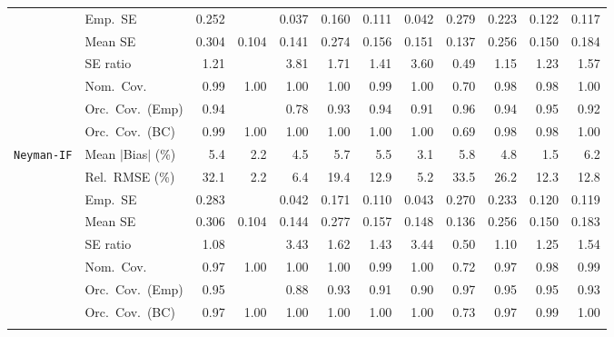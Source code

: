 \begin{landscape}
\begin{longtable}{llrrrrrrrrrr}
 & Emp.\ SE & 0.252 &  & 0.037 & 0.160 & 0.111 & 0.042 & 0.279 & 0.223 & 0.122 & 0.117 \\
 & Mean SE & 0.304 & 0.104 & 0.141 & 0.274 & 0.156 & 0.151 & 0.137 & 0.256 & 0.150 & 0.184 \\
 & SE ratio & \cellcolor{ranktwo}1.21 &  & 3.81 & 1.71 & 1.41 & 3.60 & 0.49 & \cellcolor{rankone}1.15 & \cellcolor{rankthree}1.23 & 1.57 \\
 & Nom.\ Cov. & \cellcolor{rankthree}0.99 & 1.00 & 1.00 & 1.00 & 0.99 & 1.00 & 0.70 & \cellcolor{rankone}0.98 & \cellcolor{ranktwo}0.98 & 1.00 \\
 & Orc.\ Cov.\ (Emp) & \cellcolor{ranktwo}0.94 &  & 0.78 & 0.93 & 0.94 & 0.91 & \cellcolor{rankthree}0.96 & 0.94 & \cellcolor{rankone}0.95 & 0.92 \\
 & Orc.\ Cov.\ (BC) & \cellcolor{rankthree}0.99 & 1.00 & 1.00 & 1.00 & 1.00 & 1.00 & 0.69 & \cellcolor{rankone}0.98 & \cellcolor{ranktwo}0.98 & 1.00 \\
\addlinespace[2pt]
\quad \texttt{Neyman-IF} & Mean $|$Bias$|$ (\%) & 5.4 & \cellcolor{ranktwo}2.2 & 4.5 & 5.7 & 5.5 & \cellcolor{rankthree}3.1 & 5.8 & 4.8 & \cellcolor{rankone}1.5 & 6.2 \\
 & Rel.\ RMSE (\%) & 32.1 & \cellcolor{rankone}2.2 & \cellcolor{rankthree}6.4 & 19.4 & 12.9 & \cellcolor{ranktwo}5.2 & 33.5 & 26.2 & 12.3 & 12.8 \\
 & Emp.\ SE & 0.283 &  & 0.042 & 0.171 & 0.110 & 0.043 & 0.270 & 0.233 & 0.120 & 0.119 \\
 & Mean SE & 0.306 & 0.104 & 0.144 & 0.277 & 0.157 & 0.148 & 0.136 & 0.256 & 0.150 & 0.183 \\
 & SE ratio & \cellcolor{rankone}1.08 &  & 3.43 & 1.62 & 1.43 & 3.44 & 0.50 & \cellcolor{ranktwo}1.10 & \cellcolor{rankthree}1.25 & 1.54 \\
 & Nom.\ Cov. & \cellcolor{rankone}0.97 & 1.00 & 1.00 & 1.00 & 0.99 & 1.00 & 0.72 & \cellcolor{ranktwo}0.97 & \cellcolor{rankthree}0.98 & 0.99 \\
 & Orc.\ Cov.\ (Emp) & \cellcolor{rankone}0.95 &  & 0.88 & 0.93 & 0.91 & 0.90 & 0.97 & \cellcolor{ranktwo}0.95 & \cellcolor{rankthree}0.95 & 0.93 \\
 & Orc.\ Cov.\ (BC) & \cellcolor{ranktwo}0.97 & 1.00 & 1.00 & 1.00 & 1.00 & 1.00 & 0.73 & \cellcolor{rankone}0.97 & \cellcolor{rankthree}0.99 & 1.00 \\
\addlinespace[2pt]
\end{longtable}
\end{landscape}
